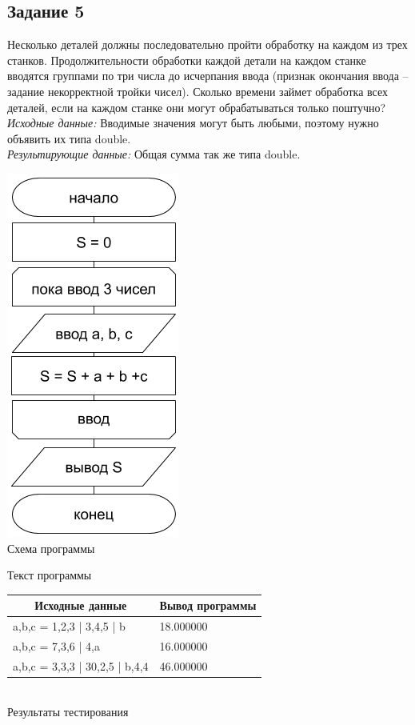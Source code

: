 \documentclass[a4paper,14pt]{extarticle}
\begin{document}
\subsection{Задание 5}
Несколько деталей должны последовательно пройти обработку на каждом из трех станков. Продолжительности обработки каждой детали на каждом станке вводятся группами по три числа до исчерпания ввода (признак окончания ввода – задание некорректной тройки чисел). Сколько времени займет обработка всех деталей, если на каждом станке они могут обрабатываться только поштучно?\\
\textit{Исходные данные:} Вводимые значения могут быть любыми, поэтому нужно объявить их типа double.\\
\textit{Результирующие данные:} Общая сумма так же типа double.\\
\begin{center}
\includegraphics[scale=0.6]{lab2-5.png}\\
Схема программы
\end{center}

\begin{center}
Текст программы
\end{center}
\begin{center}
\begin{tabular}{|l|l|}
\hline
\multicolumn{1}{|c|}{Исходные данные}& \multicolumn{1}{|c|}{Вывод программы}\\
\hline
a,b,c = 1,2,3 | 3,4,5 | b & 18.000000\\
a,b,c = 7,3,6 | 4,a & 16.000000\\
a,b,c = 3,3,3 | 30,2,5 | b,4,4 & 46.000000\\
\hline
\end{tabular}\\
\vspace{0.3cm}
Результаты тестирования
\end{center}
\end{document}
